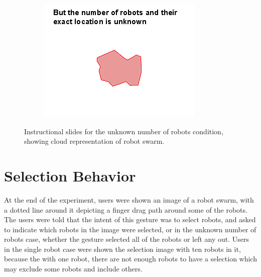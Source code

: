\begin{figure}
\begin{subfigure}{0.3\textwidth}
		\includegraphics[width=\linewidth]{../ui_experiment/slide_images/Swarm_Robot_Control_-_Unknown_Number_of_Robots_0003.png}
	\end{subfigure}
	\caption{Instructional slides for the unknown number of robots condition, showing cloud representation of robot swarm.}
	\label{instructional_slides}
\end{figure}

\section{Selection Behavior} \label{section:Selection_Strategy}

At the end of the experiment, users were shown an image of a robot swarm, with a dotted line around it depicting a finger drag path around some of the robots. 
The users were told that the intent of this gesture was to select robots, and asked to indicate which robots in the image were selected, or in the unknown number of robots case, whether the gesture selected all of the robots or left any out. 
Users in the single robot case were shown the selection image with ten robots in it, because the with one robot, there are not enough robots to have a selection which may exclude some robots and include others. 

